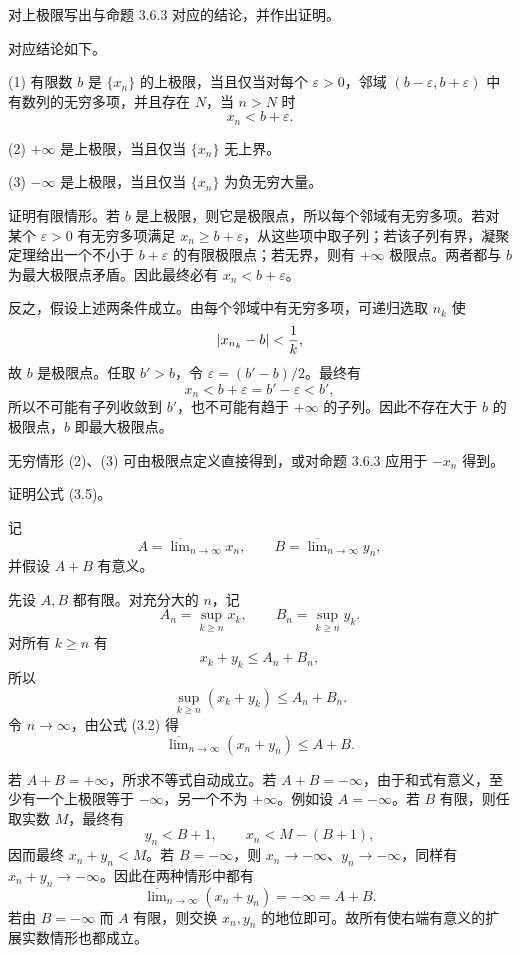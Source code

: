 \begin{xexercise}[9]
对上极限写出与命题 3.6.3 对应的结论，并作出证明。
\end{xexercise}
\begin{xsolution}
对应结论如下。

(1) 有限数 $b$ 是 $\{x_n\}$ 的上极限，当且仅当对每个 $\varepsilon>0$，邻域 $(b-\varepsilon,b+\varepsilon)$ 中有数列的无穷多项，并且存在 $N$，当 $n>N$ 时
\[
  x_n<b+\varepsilon.
\]

(2) $+\infty$ 是上极限，当且仅当 $\{x_n\}$ 无上界。

(3) $-\infty$ 是上极限，当且仅当 $\{x_n\}$ 为负无穷大量。

证明有限情形。若 $b$ 是上极限，则它是极限点，所以每个邻域有无穷多项。若对某个 $\varepsilon>0$ 有无穷多项满足 $x_n\geqslant b+\varepsilon$，从这些项中取子列；若该子列有界，凝聚定理给出一个不小于 $b+\varepsilon$ 的有限极限点；若无界，则有 $+\infty$ 极限点。两者都与 $b$ 为最大极限点矛盾。因此最终必有 $x_n<b+\varepsilon$。

反之，假设上述两条件成立。由每个邻域中有无穷多项，可递归选取 $n_k$ 使
\[
  \lvert x_{n_k}-b\rvert<\frac1k,
\]
故 $b$ 是极限点。任取 $b'>b$，令 $\varepsilon=(b'-b)/2$。最终有
\[
  x_n<b+\varepsilon=b'-\varepsilon<b',
\]
所以不可能有子列收敛到 $b'$，也不可能有趋于 $+\infty$ 的子列。因此不存在大于 $b$ 的极限点，$b$ 即最大极限点。

无穷情形 (2)、(3) 可由极限点定义直接得到，或对命题 3.6.3 应用于 $-x_n$ 得到。
\end{xsolution}


\begin{xexercise}[10]
证明公式 (3.5)。
\end{xexercise}
\begin{xsolution}
记
\[
  A=\overline{\lim}_{n\to\infty}x_n,
  \qquad
  B=\overline{\lim}_{n\to\infty}y_n,
\]
并假设 $A+B$ 有意义。

先设 $A,B$ 都有限。对充分大的 $n$，记
\[
  A_n=\sup_{k\geqslant n}x_k,
  \qquad
  B_n=\sup_{k\geqslant n}y_k.
\]
对所有 $k\geqslant n$ 有
\[
  x_k+y_k\leqslant A_n+B_n,
\]
所以
\[
  \sup_{k\geqslant n}(x_k+y_k)\leqslant A_n+B_n.
\]
令 $n\to\infty$，由公式 (3.2) 得
\[
  \overline{\lim}_{n\to\infty}(x_n+y_n)
  \leqslant A+B.
\]

若 $A+B=+\infty$，所求不等式自动成立。若 $A+B=-\infty$，由于和式有意义，至少有一个上极限等于 $-\infty$，另一个不为 $+\infty$。例如设 $A=-\infty$。若 $B$ 有限，则任取实数 $M$，最终有
\[
  y_n<B+1,
  \qquad
  x_n<M-(B+1),
\]
因而最终 $x_n+y_n<M$。若 $B=-\infty$，则 $x_n\to-\infty$、$y_n\to-\infty$，同样有 $x_n+y_n\to-\infty$。因此在两种情形中都有
\[
  \overline{\lim}_{n\to\infty}(x_n+y_n)=-\infty=A+B.
\]
若由 $B=-\infty$ 而 $A$ 有限，则交换 $x_n,y_n$ 的地位即可。故所有使右端有意义的扩展实数情形也都成立。
\end{xsolution}



